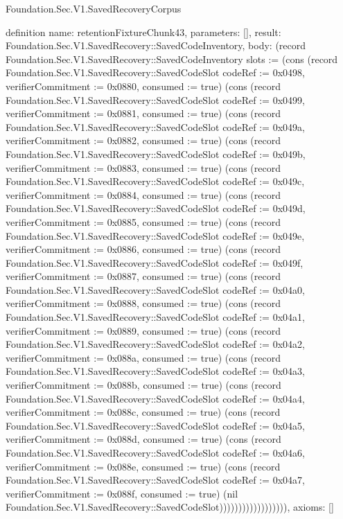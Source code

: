 \begin{lexlean}{Foundation.Sec.V1.SavedRecoveryCorpus}
\begin{semanticmodule}
definition{
  name: retentionFixtureChunk43,
  parameters: [],
  result: Foundation.Sec.V1.SavedRecovery::SavedCodeInventory,
  body: (record Foundation.Sec.V1.SavedRecovery::SavedCodeInventory {slots := (cons (record Foundation.Sec.V1.SavedRecovery::SavedCodeSlot {codeRef := 0x0498, verifierCommitment := 0x0880, consumed := true}) (cons (record Foundation.Sec.V1.SavedRecovery::SavedCodeSlot {codeRef := 0x0499, verifierCommitment := 0x0881, consumed := true}) (cons (record Foundation.Sec.V1.SavedRecovery::SavedCodeSlot {codeRef := 0x049a, verifierCommitment := 0x0882, consumed := true}) (cons (record Foundation.Sec.V1.SavedRecovery::SavedCodeSlot {codeRef := 0x049b, verifierCommitment := 0x0883, consumed := true}) (cons (record Foundation.Sec.V1.SavedRecovery::SavedCodeSlot {codeRef := 0x049c, verifierCommitment := 0x0884, consumed := true}) (cons (record Foundation.Sec.V1.SavedRecovery::SavedCodeSlot {codeRef := 0x049d, verifierCommitment := 0x0885, consumed := true}) (cons (record Foundation.Sec.V1.SavedRecovery::SavedCodeSlot {codeRef := 0x049e, verifierCommitment := 0x0886, consumed := true}) (cons (record Foundation.Sec.V1.SavedRecovery::SavedCodeSlot {codeRef := 0x049f, verifierCommitment := 0x0887, consumed := true}) (cons (record Foundation.Sec.V1.SavedRecovery::SavedCodeSlot {codeRef := 0x04a0, verifierCommitment := 0x0888, consumed := true}) (cons (record Foundation.Sec.V1.SavedRecovery::SavedCodeSlot {codeRef := 0x04a1, verifierCommitment := 0x0889, consumed := true}) (cons (record Foundation.Sec.V1.SavedRecovery::SavedCodeSlot {codeRef := 0x04a2, verifierCommitment := 0x088a, consumed := true}) (cons (record Foundation.Sec.V1.SavedRecovery::SavedCodeSlot {codeRef := 0x04a3, verifierCommitment := 0x088b, consumed := true}) (cons (record Foundation.Sec.V1.SavedRecovery::SavedCodeSlot {codeRef := 0x04a4, verifierCommitment := 0x088c, consumed := true}) (cons (record Foundation.Sec.V1.SavedRecovery::SavedCodeSlot {codeRef := 0x04a5, verifierCommitment := 0x088d, consumed := true}) (cons (record Foundation.Sec.V1.SavedRecovery::SavedCodeSlot {codeRef := 0x04a6, verifierCommitment := 0x088e, consumed := true}) (cons (record Foundation.Sec.V1.SavedRecovery::SavedCodeSlot {codeRef := 0x04a7, verifierCommitment := 0x088f, consumed := true}) (nil Foundation.Sec.V1.SavedRecovery::SavedCodeSlot)))))))))))))))))}),
  axioms: []
}


\end{semanticmodule}
\end{lexlean}
